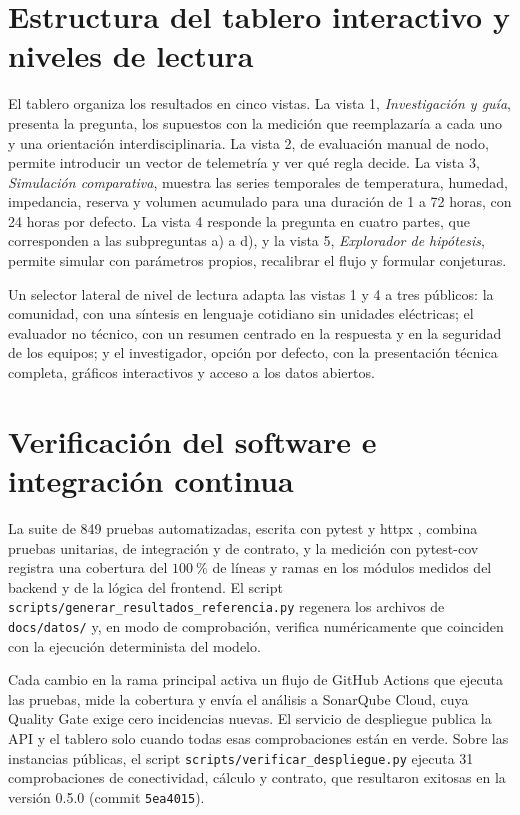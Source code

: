 \section{Estructura del tablero interactivo y niveles de lectura}
El tablero organiza los resultados en cinco vistas. La vista 1, \emph{Investigaci\'on y gu\'ia}, presenta la pregunta, los supuestos con la medici\'on que reemplazar\'ia a cada uno y una orientaci\'on interdisciplinaria. La vista 2, de evaluaci\'on manual de nodo, permite introducir un vector de telemetr\'ia y ver qu\'e regla decide. La vista 3, \emph{Simulaci\'on comparativa}, muestra las series temporales de temperatura, humedad, impedancia, reserva y volumen acumulado para una duraci\'on de 1 a 72 horas, con 24 horas por defecto. La vista 4 responde la pregunta en cuatro partes, que corresponden a las subpreguntas a) a d), y la vista 5, \emph{Explorador de hip\'otesis}, permite simular con par\'ametros propios, recalibrar el flujo y formular conjeturas.

Un selector lateral de nivel de lectura adapta las vistas 1 y 4 a tres p\'ublicos: la comunidad, con una s\'intesis en lenguaje cotidiano sin unidades el\'ectricas; el evaluador no t\'ecnico, con un resumen centrado en la respuesta y en la seguridad de los equipos; y el investigador, opci\'on por defecto, con la presentaci\'on t\'ecnica completa, gr\'aficos interactivos y acceso a los datos abiertos.

\section{Verificaci\'on del software e integraci\'on continua}
La suite de 849 pruebas automatizadas, escrita con pytest \parencite{pytest} y httpx \parencite{httpx}, combina pruebas unitarias, de integraci\'on y de contrato, y la medici\'on con pytest-cov \parencite{pytestcov} registra una cobertura del $\SI{100}{\percent}$ de l\'ineas y ramas en los m\'odulos medidos del backend y de la l\'ogica del frontend. El script \texttt{scripts/generar\_resultados\_referencia.py} regenera los archivos de \texttt{docs/datos/} y, en modo de comprobaci\'on, verifica num\'ericamente que coinciden con la ejecuci\'on determinista del modelo.

Cada cambio en la rama principal activa un flujo de GitHub Actions que ejecuta las pruebas, mide la cobertura y env\'ia el an\'alisis a SonarQube Cloud, cuya Quality Gate exige cero incidencias nuevas. El servicio de despliegue publica la API y el tablero solo cuando todas esas comprobaciones est\'an en verde. Sobre las instancias p\'ublicas, el script \texttt{scripts/verificar\_despliegue.py} ejecuta 31 comprobaciones de conectividad, c\'alculo y contrato, que resultaron exitosas en la versi\'on 0.5.0 (commit \texttt{5ea4015}).

